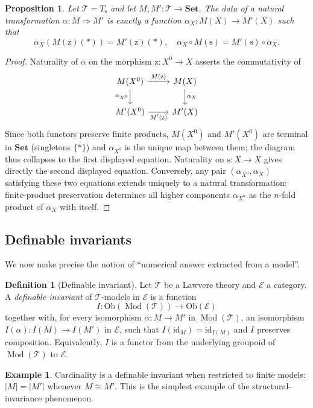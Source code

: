 \documentclass[12pt]{article}
\newtheorem{proposition}[theorem]{Proposition}
\theoremstyle{definition}
\newtheorem{definition}[theorem]{Definition}
\newtheorem{example}[theorem]{Example}
\theoremstyle{remark}
\newcommand{\Set}{\mathbf{Set}}
\newcommand{\id}{\mathrm{id}}
\newcommand{\T}{\mathcal{T}}
\newcommand{\E}{\mathcal{E}}
\newcommand{\Mod}[1]{\operatorname{Mod}(#1)}
\newcommand{\iso}{\cong}
\newcommand{\succop}{\mathrm{s}}
\newcommand{\zeroop}{\mathrm{z}}
\newcommand{\Ob}{\mathrm{Ob}}
\begin{document}
\begin{proposition}\label{prop:hom-as-nat}
Let $\T = T_\succop$ and let $M, M' : \T \to \Set$. The data of a natural transformation $\alpha : M \Rightarrow M'$ is exactly a function $\alpha_X : M(X) \to M'(X)$ such that
\[
  \alpha_X(M(\zeroop)(\ast)) = M'(\zeroop)(\ast), \quad
  \alpha_X \circ M(\succop) = M'(\succop) \circ \alpha_X.
\]
\end{proposition}

\begin{proof}
Naturality of $\alpha$ on the morphism $\zeroop : X^0 \to X$ asserts the commutativity of
\[
\begin{tikzcd}
M(X^0) \arrow[r, "M(\zeroop)"] \arrow[d, "\alpha_{X^0}"'] & M(X) \arrow[d, "\alpha_X"] \\
M'(X^0) \arrow[r, "M'(\zeroop)"'] & M'(X)
\end{tikzcd}
\]
Since both functors preserve finite products, $M(X^0)$ and $M'(X^0)$ are terminal in $\Set$ (singletons $\{\ast\}$) and $\alpha_{X^0}$ is the unique map between them; the diagram thus collapses to the first displayed equation. Naturality on $\succop : X \to X$ gives directly the second displayed equation. Conversely, any pair $(\alpha_{X^0}, \alpha_X)$ satisfying these two equations extends uniquely to a natural transformation: finite-product preservation determines all higher components $\alpha_{X^n}$ as the $n$-fold product of $\alpha_X$ with itself.
\end{proof}

\subsection{Definable invariants}

We now make precise the notion of ``numerical answer extracted from a model''.

\begin{definition}[Definable invariant]\label{def:def-inv}
Let $\T$ be a Lawvere theory and $\E$ a category. A \emph{definable invariant} of $\T$-models in $\E$ is a function
\[
  I : \Ob(\Mod{\T}) \to \Ob(\E)
\]
together with, for every isomorphism $\alpha : M \to M'$ in $\Mod{\T}$, an isomorphism $I(\alpha) : I(M) \to I(M')$ in $\E$, such that $I(\id_M) = \id_{I(M)}$ and $I$ preserves composition. Equivalently, $I$ is a functor from the underlying groupoid of $\Mod{\T}$ to $\E$.
\end{definition}

\begin{example}\label{ex:cardinality}
Cardinality is a definable invariant when restricted to finite models: $|M| = |M'|$ whenever $M \iso M'$. This is the simplest example of the structural-invariance phenomenon.
\end{example}
\end{document}
